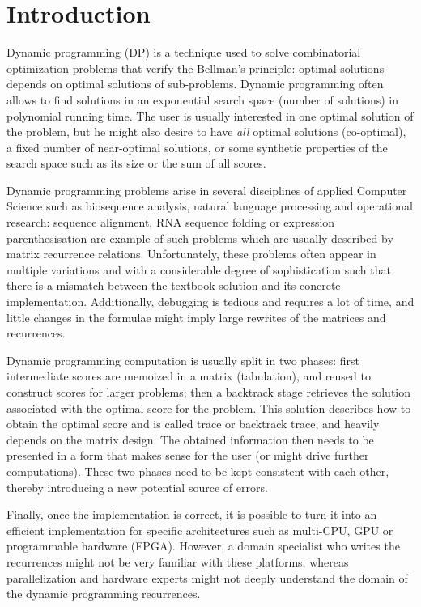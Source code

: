 \newpage
\setcounter{tocdepth}{2} \tableofcontents
\newpage
\section{Introduction}
Dynamic programming (DP) is a technique used to solve combinatorial optimization problems that verify the Bellman's principle\cite{bellman_principle}: optimal solutions depends on optimal solutions of sub-problems. Dynamic programming often allows to find solutions in an exponential search space (number of solutions) in polynomial running time. The user is usually interested in one optimal solution of the problem, but he might also desire to have \textit{all} optimal solutions (co-optimal), a fixed number of near-optimal solutions, or some synthetic properties of the search space such as its size or the sum of all scores.

Dynamic programming problems arise in several disciplines of applied Computer Science such as biosequence analysis, natural language processing and operational research: sequence alignment, RNA sequence folding or expression parenthesisation are example of such problems which are usually described by matrix recurrence relations. Unfortunately, these problems often appear in multiple variations and with a considerable degree of sophistication such that there is a mismatch between the textbook solution and its concrete implementation. Additionally, debugging is tedious and requires a lot of time, and little changes in the formulae might imply large rewrites of the matrices and recurrences\cite{gapc_yield}.

Dynamic programming computation is usually split in two phases: first intermediate scores are memoized in a matrix (tabulation), and reused to construct scores for larger problems; then a backtrack stage retrieves the solution associated with the optimal score for the problem. This solution describes how to obtain the optimal score and is called trace or backtrack trace, and heavily depends on the matrix design. The obtained information then needs to be presented in a form that makes sense for the user (or  might drive further computations). These two phases need to be kept consistent with each other, thereby introducing a new potential source of errors.

Finally, once the implementation is correct, it is possible to turn it into an efficient implementation for specific architectures such as multi-CPU, GPU or programmable hardware (FPGA). However, a domain specialist who writes the recurrences might not be very familiar with these platforms, whereas parallelization and hardware experts might not deeply understand the domain of the dynamic programming recurrences.

